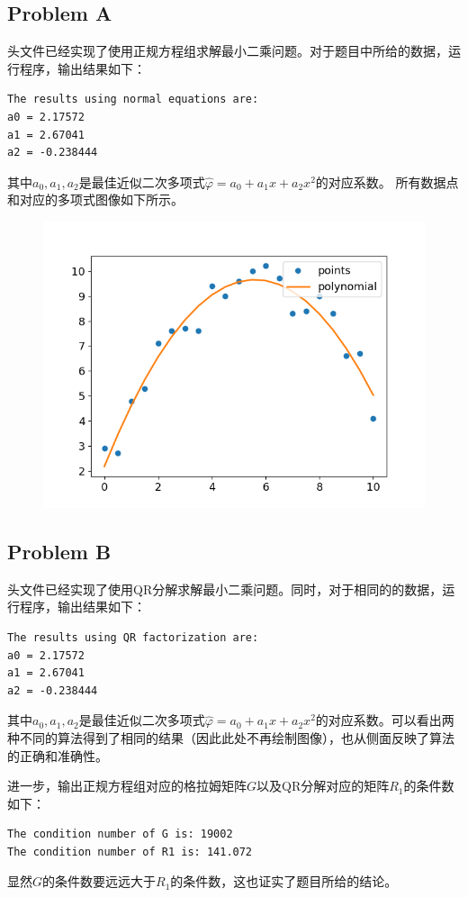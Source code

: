 \documentclass{ctexart}
\begin{document}
\begin{sloppypar}
\subsection*{Problem A}
头文件已经实现了使用正规方程组求解最小二乘问题。对于题目中所给的数据，运行程序，输出结果如下：
\begin{shaded}
\begin{verbatim}
The results using normal equations are: 
a0 = 2.17572
a1 = 2.67041
a2 = -0.238444
\end{verbatim}
\end{shaded}
其中$a_0,a_1,a_2$是最佳近似二次多项式$\hat{\varphi} = a_0 + a_1x + a_2x^2$的对应系数。
所有数据点和对应的多项式图像如下所示。
\begin{figure}[H]
\centering
\includegraphics[scale = 0.5]{Figure_1.png}
\label{fig1}
\end{figure}
\subsection*{Problem B}
头文件已经实现了使用QR分解求解最小二乘问题。同时，对于相同的的数据，运行程序，输出结果如下：
\begin{shaded}
\begin{verbatim}
The results using QR factorization are: 
a0 = 2.17572
a1 = 2.67041
a2 = -0.238444
\end{verbatim}
\end{shaded}
其中$a_0,a_1,a_2$是最佳近似二次多项式$\hat{\varphi} = a_0 + a_1x + a_2x^2$的对应系数。可以看出两种不同的算法得到了相同的结果（因此此处不再绘制图像），也从侧面反映了算法的正确和准确性。

进一步，输出正规方程组对应的格拉姆矩阵$G$以及QR分解对应的矩阵$R_1$的条件数如下：
\begin{shaded}
\begin{verbatim}
The condition number of G is: 19002
The condition number of R1 is: 141.072
\end{verbatim}
\end{shaded}
\end{sloppypar}
显然$G$的条件数要远远大于$R_1$的条件数，这也证实了题目所给的结论。
\end{document}
